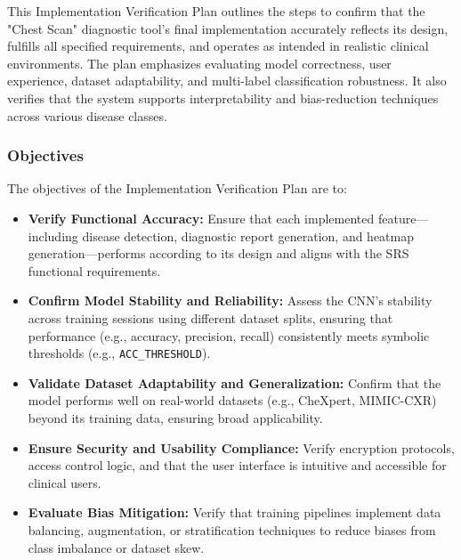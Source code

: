 \documentclass[12pt, titlepage]{article}
\begin{document}
This Implementation Verification Plan outlines the steps to confirm that the "Chest Scan" diagnostic tool's final implementation accurately reflects its design, fulfills all specified requirements, and operates as intended in realistic clinical environments. The plan emphasizes evaluating model correctness, user experience, dataset adaptability, and multi-label classification robustness. It also verifies that the system supports interpretability and bias-reduction techniques across various disease classes.

\subsubsection{Objectives}
The objectives of the Implementation Verification Plan are to:
\begin{itemize}
  \item \textbf{Verify Functional Accuracy:} Ensure that each implemented feature---including disease detection, diagnostic report generation, and heatmap generation---performs according to its design and aligns with the SRS functional requirements.
  \item \textbf{Confirm Model Stability and Reliability:} Assess the CNN's stability across training sessions using different dataset splits, ensuring that performance (e.g., accuracy, precision, recall) consistently meets symbolic thresholds (e.g., \texttt{ACC\_THRESHOLD}).
  \item \textbf{Validate Dataset Adaptability and Generalization:} Confirm that the model performs well on real-world datasets (e.g., CheXpert, MIMIC-CXR) beyond its training data, ensuring broad applicability.
  \item \textbf{Ensure Security and Usability Compliance:} Verify encryption protocols, access control logic, and that the user interface is intuitive and accessible for clinical users.
  \item \textbf{Evaluate Bias Mitigation:} Verify that training pipelines implement data balancing, augmentation, or stratification techniques to reduce biases from class imbalance or dataset skew.
\end{itemize}
\end{document}
